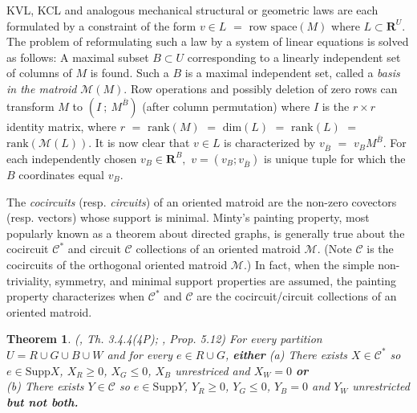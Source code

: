 \documentclass{article}
\def\Reals{\ensuremath{\mathbf R}}
\newtheorem{theorem}{Theorem}
\begin{document}
KVL, KCL and analogous mechanical structural or geometric laws 
are each formulated by a constraint of the form 
$v\in L$ $=$ $\mbox{row space}(M)$
where $L\subset\Reals^U$.  The problem of
reformulating such a law by a system of linear equations is
solved as follows:  A maximal subset $B\subset U$ corresponding to
a linearly independent set of columns of $M$ is found.  Such a $B$ is
a maximal independent set,
called a \textit{basis in the matroid} $\mathcal{M}(M)$.
Row operations and possibly deletion of zero rows can transform
$M$ to $( I\ ;\ M^{\overline{B}} )$ (after column permutation)
where $I$ is the $r\times r$ identity matrix, where $r$ $=$ 
$\mbox{rank}(M)$ $=$ $\mbox{dim}(L)$ $=$ $\mbox{rank}(L)$
$=$ $\mbox{rank}(\mathcal{M}(L))$.    
It is now clear that $v\in L$ is characterized by 
$v_{\overline{B}}$ $=$ $v_{B}M^{\overline{B}}$.
For each independently chosen
$v_{B}\in\Reals^B,$ $v=(v_B;v_{\overline{B}})$ is unique tuple
for which the $B$ coordinates equal $v_B$.

The \textit{cocircuits} (resp. \textit{circuits})
of an oriented matroid are the non-zero covectors (resp. vectors)
whose support is minimal.  Minty's painting property,
most popularly known as a theorem about 
directed graphs\cite{VandewalleChua}, is generally true about
the cocircuit $\mathcal{C}^*$ and circuit 
$\mathcal{C}$ collections of an oriented matroid $\mathcal{M}$.
(Note $\mathcal{C}$ is the
cocircuits of the orthogonal oriented matroid $\mathcal{M}$.)
In fact, when the 
simple non-triviality, symmetry, and minimal support properties are assumed, 
the painting property characterizes when 
$\mathcal{C}^*$ and $\mathcal{C}$ are the cocircuit/circuit collections of 
an oriented matroid.

\begin{theorem}
(\cite{OMBOOK}, Th. 3.4.4(4P); \cite{BachemKern}, Prop. 5.12) 
For every partition $U=R\cup G \cup B \cup W$ and for every $e\in R\cup G$,
\textbf{either} %
(a) There exists $X\in\mathcal{C}^*$ so $e\in\mbox{Supp}{X}$,
$X_R\geq 0$, $X_G\leq 0$, $X_B$ unrestriced and $X_W=0$ %
\textbf{or}\\
(b) There exists $Y\in\mathcal{C}$ so $e\in\mbox{Supp}{Y}$,
$Y_R\geq 0$, $Y_G\leq 0$, $Y_B = 0$ and $Y_W$ unrestricted %
\textbf{but not both.}
\end{theorem}
\end{document}
